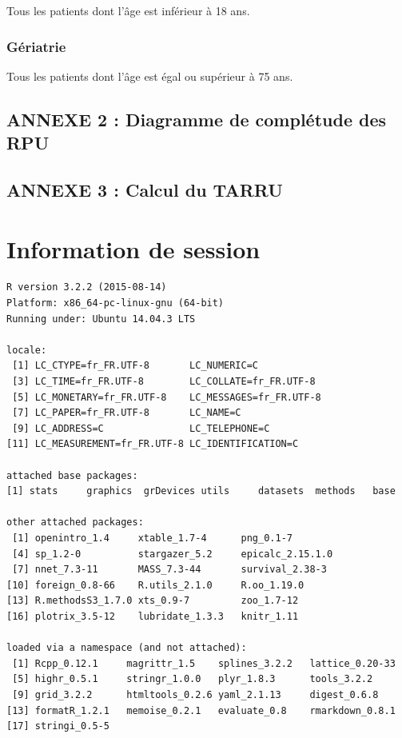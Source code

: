 \documentclass[]{article}
\begin{document}
Tous les patients dont l'âge est inférieur à 18 ans.

\subsubsection{Gériatrie}\label{geriatrie}

Tous les patients dont l'âge est égal ou supérieur à 75 ans.

\subsection{ANNEXE 2 : Diagramme de complétude des
RPU}\label{annexe-2-diagramme-de-completude-des-rpu}

\subsection{ANNEXE 3 : Calcul du TARRU}\label{annexe-3-calcul-du-tarru}

\section{Information de session}\label{information-de-session}

\begin{verbatim}
R version 3.2.2 (2015-08-14)
Platform: x86_64-pc-linux-gnu (64-bit)
Running under: Ubuntu 14.04.3 LTS

locale:
 [1] LC_CTYPE=fr_FR.UTF-8       LC_NUMERIC=C              
 [3] LC_TIME=fr_FR.UTF-8        LC_COLLATE=fr_FR.UTF-8    
 [5] LC_MONETARY=fr_FR.UTF-8    LC_MESSAGES=fr_FR.UTF-8   
 [7] LC_PAPER=fr_FR.UTF-8       LC_NAME=C                 
 [9] LC_ADDRESS=C               LC_TELEPHONE=C            
[11] LC_MEASUREMENT=fr_FR.UTF-8 LC_IDENTIFICATION=C       

attached base packages:
[1] stats     graphics  grDevices utils     datasets  methods   base     

other attached packages:
 [1] openintro_1.4     xtable_1.7-4      png_0.1-7        
 [4] sp_1.2-0          stargazer_5.2     epicalc_2.15.1.0 
 [7] nnet_7.3-11       MASS_7.3-44       survival_2.38-3  
[10] foreign_0.8-66    R.utils_2.1.0     R.oo_1.19.0      
[13] R.methodsS3_1.7.0 xts_0.9-7         zoo_1.7-12       
[16] plotrix_3.5-12    lubridate_1.3.3   knitr_1.11       

loaded via a namespace (and not attached):
 [1] Rcpp_0.12.1     magrittr_1.5    splines_3.2.2   lattice_0.20-33
 [5] highr_0.5.1     stringr_1.0.0   plyr_1.8.3      tools_3.2.2    
 [9] grid_3.2.2      htmltools_0.2.6 yaml_2.1.13     digest_0.6.8   
[13] formatR_1.2.1   memoise_0.2.1   evaluate_0.8    rmarkdown_0.8.1
[17] stringi_0.5-5  
\end{verbatim}
\end{document}
